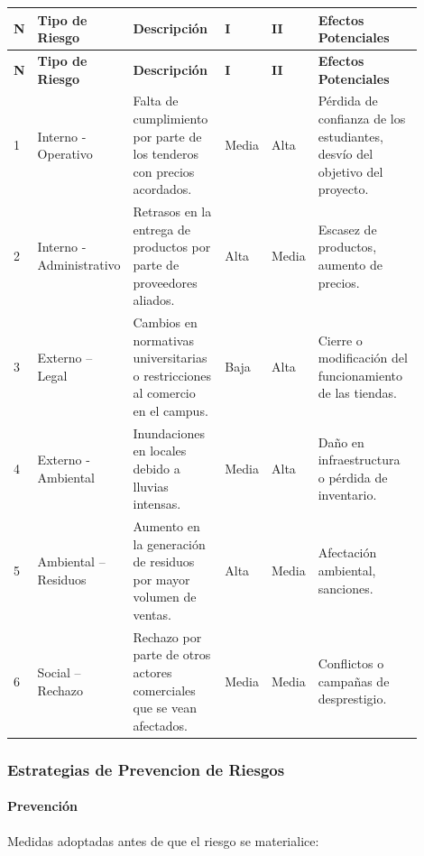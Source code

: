 \documentclass[letterpaper, 11pt]{report}
\begin{document}
\begin{longtable}{|p{0.05\linewidth}|p{0.1\linewidth}|p{0.25\linewidth}|p{0.1\linewidth}|p{0.1\linewidth}|p{0.3\linewidth}|}
\hline
\textbf{N} & \textbf{Tipo de Riesgo} & \textbf{Descripción} & \textbf{I\footnotemark[1]} & \textbf{II\footnotemark[2]} & \textbf{Efectos Potenciales} \\
\hline
\endfirsthead

\hline
\textbf{N} & \textbf{Tipo de Riesgo} & \textbf{Descripción} & \textbf{I\footnotemark[1]} & \textbf{II\footnotemark[2]} & \textbf{Efectos Potenciales} \\
\hline
\endhead

\hline
\endfoot

\hline
\endlastfoot

1 & Interno - Operativo & Falta de cumplimiento por parte de los tenderos con precios acordados. & Media & Alta & Pérdida de confianza de los estudiantes, desvío del objetivo del proyecto. \\
\hline
2 & Interno - Administrativo & Retrasos en la entrega de productos por parte de proveedores aliados. & Alta & Media & Escasez de productos, aumento de precios. \\
\hline
3 & Externo – Legal & Cambios en normativas universitarias o restricciones al comercio en el campus. & Baja & Alta & Cierre o modificación del funcionamiento de las tiendas. \\
\hline
4 & Externo - Ambiental & Inundaciones en locales debido a lluvias intensas. & Media & Alta & Daño en infraestructura o pérdida de inventario. \\
\hline
5 & Ambiental – Residuos & Aumento en la generación de residuos por mayor volumen de ventas. & Alta & Media & Afectación ambiental, sanciones. \\
\hline
6 & Social – Rechazo & Rechazo por parte de otros actores comerciales que se vean afectados. & Media & Media & Conflictos o campañas de desprestigio. \\
\hline


\end{longtable}

\subsubsection{Estrategias de Prevencion de Riesgos}

\paragraph{Prevención}\hfill{}\break{}
Medidas adoptadas antes de que el riesgo se materialice:
\end{document}
